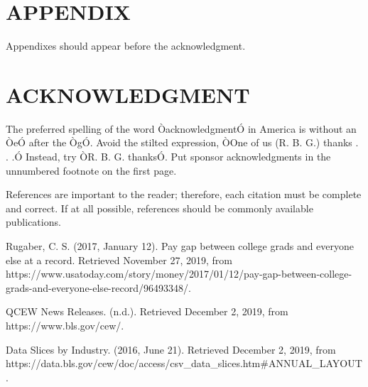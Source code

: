 \documentclass[letterpaper, 10 pt, conference]{ieeeconf}  %
\begin{document}






\section*{APPENDIX}

Appendixes should appear before the acknowledgment.

\section*{ACKNOWLEDGMENT}

The preferred spelling of the word ÒacknowledgmentÓ in America is without an ÒeÓ after the ÒgÓ. Avoid the stilted expression, ÒOne of us (R. B. G.) thanks . . .Ó  Instead, try ÒR. B. G. thanksÓ. Put sponsor acknowledgments in the unnumbered footnote on the first page.




References are important to the reader; therefore, each citation must be complete and correct. If at all possible, references should be commonly available publications.



\begin{thebibliography}{99}

 Rugaber, C. S. (2017, January 12). Pay gap between college grads and everyone else at a record. Retrieved November 27, 2019, from https://www.usatoday.com/story/money/2017/01/12/pay-gap-between-college-grads-and-everyone-else-record/96493348/.

 QCEW News Releases. (n.d.). Retrieved December 2, 2019, from https://www.bls.gov/cew/.

 Data Slices by Industry. (2016, June 21). Retrieved December 2, 2019, from \newline
https://data.bls.gov/cew/doc/access/csv\_data\_slices.htm\#ANNUAL\_LAYOUT.

\end{thebibliography}
\end{document}
